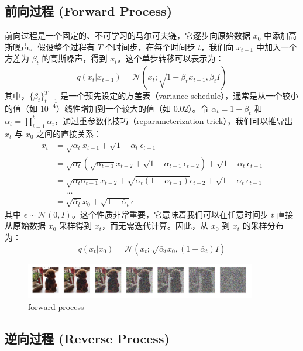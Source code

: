 \documentclass{ctexart}
\begin{document}
\subsection{前向过程 (Forward Process)}

前向过程是一个固定的、不可学习的马尔可夫链，它逐步向原始数据 $x_0$ 中添加高斯噪声。假设整个过程有 $T$ 个时间步，在每个时间步 $t$，我们向 $x_{t-1}$ 中加入一个方差为 $\beta_t$ 的高斯噪声，得到 $x_t$。这个单步转移可以表示为：
$$ q(x_t | x_{t-1}) = \mathcal{N}(x_t; \sqrt{1 - \beta_t} x_{t-1}, \beta_t I) $$
其中，$\{\beta_t\}_{t=1}^T$ 是一个预先设定的方差表（variance schedule），通常是从一个较小的值（如 $10^{-4}$）线性增加到一个较大的值（如 $0.02$）。令 $\alpha_t = 1 - \beta_t$ 和 $\bar{\alpha}_t = \prod_{i=1}^{t} \alpha_i$，通过重参数化技巧（reparameterization trick），我们可以推导出 $x_t$ 与 $x_0$ 之间的直接关系：
\begin{align*}
    x_t &= \sqrt{\alpha_t}x_{t-1} + \sqrt{1-\alpha_t}\epsilon_{t-1} \\
    &= \sqrt{\alpha_t}(\sqrt{\alpha_{t-1}}x_{t-2} + \sqrt{1-\alpha_{t-1}}\epsilon_{t-2}) + \sqrt{1-\alpha_t}\epsilon_{t-1} \\
    &= \sqrt{\alpha_t\alpha_{t-1}}x_{t-2} + \sqrt{\alpha_t(1-\alpha_{t-1})}\epsilon_{t-2} + \sqrt{1-\alpha_t}\epsilon_{t-1} \\
    &= \dots \\
    &= \sqrt{\bar{\alpha}_t}x_0 + \sqrt{1 - \bar{\alpha}_t}\epsilon
\end{align*}
其中 $\epsilon \sim \mathcal{N}(0, I)$。这个性质非常重要，它意味着我们可以在任意时间步 $t$ 直接从原始数据 $x_0$ 采样得到 $x_t$，而无需迭代计算。因此，从 $x_0$ 到 $x_t$ 的采样分布为：
$$ q(x_t | x_0) = \mathcal{N}(x_t; \sqrt{\bar{\alpha}_t} x_0, (1 - \bar{\alpha}_t) I) $$

 \begin{figure}[H]
    \centering
    \includegraphics[width=0.9\textwidth]{forward.png}
    \caption{forward process}
    \label{fig:forward}
 \end{figure}

\subsection{逆向过程 (Reverse Process)}
\end{document}
